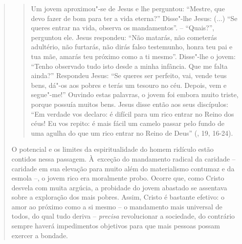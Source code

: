 {\begin{quote}
\begin{quote}
Um jovem aproximou"-se de Jesus e lhe perguntou: ``Mestre, que devo fazer
de bom para ter a vida eterna?'' Disse"-lhe Jesus: (...) ``Se queres
entrar na vida, observa os mandamentos''. -- ``Quais?'', perguntou ele.
Jesus respondeu: ``Não matarás, não cometerás adultério, não furtarás,
não dirás falso testemunho, honra teu pai e tua mãe, amarás teu próximo
como a ti mesmo''. Disse"-lhe o jovem: ``Tenho observado tudo isto desde
a minha infância. Que me falta ainda?'' Respondeu Jesus: ``Se queres ser
perfeito, vai, vende teus bens, dá"-os aos pobres e terás um tesouro no
céu. Depois, vem e segue"-me!'' Ouvindo estas palavras, o jovem foi
embora muito triste, porque possuía muitos bens. Jesus disse então aos
seus discípulos: ``Em verdade vos declaro: é difícil para um rico entrar
no Reino dos céus! Eu vos repito: é mais fácil um camelo passar pelo
fundo de uma agulha do que um rico entrar no Reino de Deus'' (,
19, 16-24).
\end{quote}

O potencial e os limites da espiritualidade do homem ridículo estão
contidos nessa passagem. À~exceção do mandamento radical da caridade --
caridade em sua elevação para muito além do materialismo contumaz e da
esmola --, o jovem rico era moralmente probo. Ocorre que, como Cristo
desvela com muita argúcia, a probidade do jovem abastado se assentava
sobre a exploração dos mais pobres. Assim, Cristo é bastante efetivo: o
amor ao próximo como a si mesmo -- o mandamento mais universal de todos,
do qual tudo deriva -- \emph{precisa} revolucionar a sociedade, do
contrário sempre haverá impedimentos objetivos para que mais pessoas
possam exercer a bondade.


\end{quote}}
